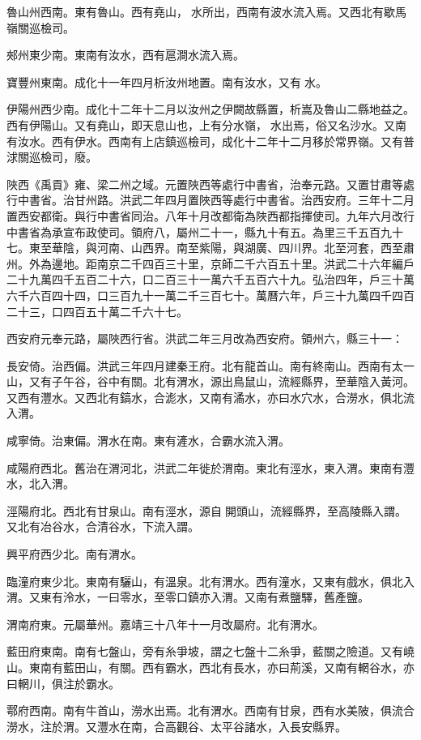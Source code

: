 魯山州西南。東有魯山。西有堯山，水所出，西南有波水流入焉。又西北有歇馬嶺關巡檢司。

郟州東少南。東南有汝水，西有扈澗水流入焉。

寶豐州東南。成化十一年四月析汝州地置。南有汝水，又有水。

伊陽州西少南。成化十二年十二月以汝州之伊闕故縣置，析嵩及魯山二縣地益之。西有伊陽山。又有堯山，即天息山也，上有分水嶺，水出焉，俗又名沙水。又南有汝水。西有伊水。西南有上店鎮巡檢司，成化十二年十二月移於常界嶺。又有普浗關巡檢司，廢。

陜西《禹貢》雍、梁二州之域。元置陜西等處行中書省，治奉元路。又置甘肅等處行中書省。治甘州路。洪武二年四月置陜西等處行中書省。治西安府。三年十二月置西安都衛。與行中書省同治。八年十月改都衛為陜西都指揮使司。九年六月改行中書省為承宣布政使司。領府八，屬州二十一，縣九十有五。為里三千五百九十七。東至華陰，與河南、山西界。南至紫陽，與湖廣、四川界。北至河套，西至肅州。外為邊地。距南京二千四百三十里，京師二千六百五十里。洪武二十六年編戶二十九萬四千五百二十六，口二百三十一萬六千五百六十九。弘治四年，戶三十萬六千六百四十四，口三百九十一萬二千三百七十。萬曆六年，戶三十九萬四千四百二十三，口四百五十萬二千六十七。

西安府元奉元路，屬陜西行省。洪武二年三月改為西安府。領州六，縣三十一：

長安倚。治西偏。洪武三年四月建秦王府。北有龍首山。南有終南山。西南有太一山，又有子午谷，谷中有關。北有渭水，源出鳥鼠山，流經縣界，至華陰入黃河。又西有灃水。又西北有鎬水，合滮水，又南有潏水，亦曰水穴水，合澇水，俱北流入渭。

咸寧倚。治東偏。渭水在南。東有滻水，合霸水流入渭。

咸陽府西北。舊治在渭河北，洪武二年徙於渭南。東北有涇水，東入渭。東南有灃水，北入渭。

涇陽府北。西北有甘泉山。南有涇水，源自開頭山，流經縣界，至高陵縣入謂。又北有冶谷水，合清谷水，下流入謂。

興平府西少北。南有渭水。

臨潼府東少北。東南有驪山，有溫泉。北有渭水。西有潼水，又東有戲水，俱北入渭。又東有泠水，一曰零水，至零口鎮亦入渭。又南有煮鹽驛，舊產鹽。

渭南府東。元屬華州。嘉靖三十八年十一月改屬府。北有渭水。

藍田府東南。南有七盤山，旁有糸爭坡，謂之七盤十二糸爭，藍關之險道。又有嶢山。東南有藍田山，有關。西有霸水，西北有長水，亦曰荊溪，又南有輞谷水，亦曰輞川，俱注於霸水。

鄠府西南。南有牛首山，澇水出焉。北有渭水。西南有甘泉，西有水美陂，俱流合澇水，注於渭。又灃水在南，合高觀谷、太平谷諸水，入長安縣界。

